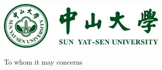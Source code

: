 \documentclass{article}
\begin{document}
\includegraphics[width=0.618\textwidth]{sysu.pdf}









\begin{FlushLeft}
To whom it may concerns
\end{FlushLeft}
\end{document}
